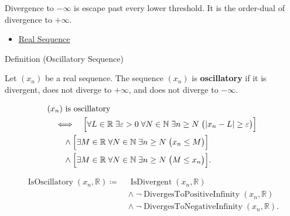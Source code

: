 \begin{remark*}[Interpretation]
Divergence to $-\infty$ is escape past every lower threshold. It is the
order-dual of divergence to $+\infty$.
\end{remark*}

\begin{dependencies}
\begin{itemize}
  \item \hyperref[def:real-sequence]{Real Sequence}
\end{itemize}
\end{dependencies}


\begin{definitionbox}{Definition (Oscillatory Sequence)}
\begin{definition}
\label{def:oscillatory-sequence}
Let $(x_n)$ be a real sequence. The sequence $(x_n)$ is
\textbf{oscillatory} if it is divergent, does not diverge to $+\infty$,
and does not diverge to $-\infty$.
\end{definition}
\end{definitionbox}

\begin{remark*}
\[
\begin{aligned}
&(x_n)\text{ is oscillatory}\\
&\quad\Longleftrightarrow\quad
\Bigl[
  \forall L\in\mathbb{R}\;\exists \varepsilon>0\;\forall N\in\mathbb{N}
  \;\exists n\ge N\;\bigl(|x_n-L|\ge\varepsilon\bigr)
\Bigr]\\
&\qquad\land
\Bigl[
  \exists M\in\mathbb{R}\;\forall N\in\mathbb{N}\;\exists n\ge N
  \;\bigl(x_n\le M\bigr)
\Bigr]\\
&\qquad\land
\Bigl[
  \exists M\in\mathbb{R}\;\forall N\in\mathbb{N}\;\exists n\ge N
  \;\bigl(M\le x_n\bigr)
\Bigr].
\end{aligned}
\]
\end{remark*}

\begin{remark*}
\[
\begin{aligned}
\operatorname{IsOscillatory}(x_n,\mathbb{R})
\coloneqq\;&
\operatorname{IsDivergent}(x_n,\mathbb{R})\\
&\land\;\neg\operatorname{DivergesToPositiveInfinity}(x_n,\mathbb{R})\\
&\land\;\neg\operatorname{DivergesToNegativeInfinity}(x_n,\mathbb{R}).
\end{aligned}
\]
\end{remark*}

